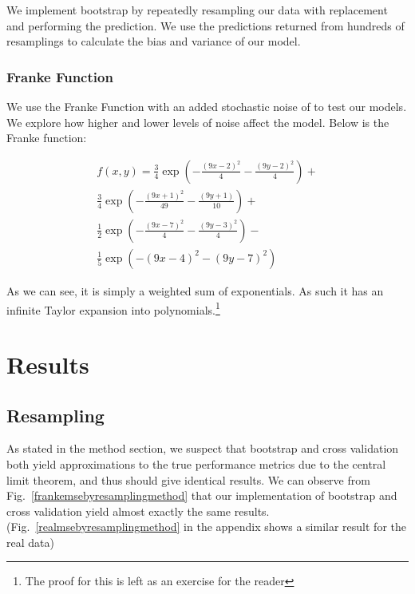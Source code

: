 \documentclass[twocolumn,10pt,cleanfoot]{asme2ej}
\begin{document}
We implement bootstrap by repeatedly resampling our data with replacement and performing the prediction. We use the predictions returned from hundreds of resamplings to calculate the bias and variance of our model.

\subsubsection{Franke Function}

We use the Franke Function with an added stochastic noise of to test our models. We explore how higher and lower levels of noise affect the model. Below is the Franke function:

\begin{multline}
f(x,y) = \frac{3}{4}\exp{\left(-\frac{(9x-2)^2}{4}-\frac{(9y-2)^2}{4}\right)} + \\ \frac{3}{4}\exp{\left(-\frac{(9x+1)^2}{49}-\frac{(9y+1)}{10}\right)} + \\
\frac{1}{2}\exp{\left(-\frac{(9x-7)^2}{4}-\frac{(9y-3)^2}{4}\right)} - \\
\frac{1}{5}\exp{\left(-(9x-4)^2-(9y-7)^2\right)}
\end{multline}

As we can see, it is simply a weighted sum of exponentials. As such it has an infinite Taylor expansion into polynomials.\footnote{The proof for this is left as an exercise for the reader}


\section{Results}

\subsection{Resampling}

As stated in the method section, we suspect that bootstrap and cross validation both yield approximations to the true performance metrics due to the central limit theorem, and thus should give identical results. We can observe from Fig.~\ref{frankemsebyresamplingmethod} that our implementation of bootstrap and cross validation yield almost exactly the same results. (Fig.~\ref{realmsebyresamplingmethod} in the appendix shows a similar result for the real data)
\end{document}
